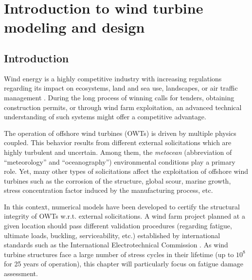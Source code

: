 \cleardoublepage
\chapter{Introduction to wind turbine modeling and design}
\label{chpt:2}
\hfill
\localtableofcontents
\newpage

\section{Introduction}

Wind energy is a highly competitive industry with increasing regulations regarding its impact on ecosystems, land and sea use, landscapes, or air traffic management \citep{eolien_en_mer_2022}. 
During the long process of winning calls for tenders, obtaining construction permits, or through wind farm exploitation, an advanced technical understanding of such systems might offer a competitive advantage. 

The operation of offshore wind turbines (OWTs) is driven by multiple physics coupled. 
This behavior results from different external solicitations which are highly turbulent and uncertain. 
Among them, the \textit{metocean} (abbreviation of ``meteorology'' and ``oceanography'') environmental conditions play a primary role. 
Yet, many other types of solicitations affect the exploitation of offshore wind turbines such as the corrosion of the structure, global scour, marine growth, stress concentration factor induced by the manufacturing process, etc. 

In this context, numerical models have been developed to certify the structural integrity of OWTs w.r.t. external solicitations. 
A wind farm project planned at a given location should pass different validation procedures (regarding fatigue, ultimate loads, buckling, serviceability, etc.) established by international standards such as the International Electrotechnical Commission \citep{iec_2019}. 
As wind turbine structures face a large number of stress cycles in their lifetime (up to $10^8$ for 25 years of operation), this chapter will particularly focus on fatigue damage assessment.

